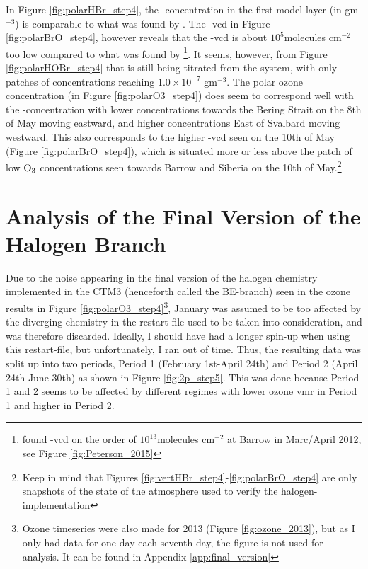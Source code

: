 \medskip

In Figure \ref{fig:polarHBr_step4}, the -concentration in the first model layer (in gm$^{-3}$) is comparable to what was found by \cite{barrie}. The -\acrshort{vcd} in Figure \ref{fig:polarBrO_step4}, however reveals that the -\acrshort{vcd} is about $10^5$molecules cm$^{-2}$ too low compared to what was found by \cite{Peterson2015}\footnote{\cite{Peterson2015} found -\acrshort{vcd} on the order of $10^13$molecules cm$^{-2}$ at Barrow in Marc/April 2012, see Figure \ref{fig:Peterson_2015}}. It seems, however, from Figure \ref{fig:polarHOBr_step4} that  is still being titrated from the system, with only patches of concentrations reaching $1.0\times10^{-7}$ gm$^{-3}$. The polar ozone concentration (in Figure \ref{fig:polarO3_step4}) does seem to correspond well with the -concentration with lower concentrations towards the Bering Strait on the 8th of May moving eastward, and higher concentrations East of Svalbard moving westward. This also corresponds to the higher -vcd seen on the 10th of May (Figure \ref{fig:polarBrO_step4}), which is situated more or less above the patch of low $\mathrm{O_3}$ concentrations seen towards Barrow and Siberia on the 10th of May.\footnote{Keep in mind that Figures \ref{fig:vertHBr_step4}-\ref{fig:polarBrO_step4} are only snapshots of the state of the atmosphere used to verify the halogen-implementation} 

\section{Analysis of the Final Version of the Halogen Branch}\label{sec:disc_final_Version}

Due to the noise appearing in the final version of the halogen chemistry implemented in the CTM3 (henceforth called the BE-branch) seen in the ozone results in Figure \ref{fig:polarO3_step4}\footnote{Ozone timeseries were also made for 2013 (Figure \ref{fig:ozone_2013}), but as I only had data for one day each seventh day, the figure is not used for analysis. It can be found in Appendix \ref{app:final_version}}, January was assumed to be too affected by the diverging chemistry in the restart-file used to be taken into consideration, and was therefore discarded. Ideally, I should have had a longer spin-up when using this restart-file, but unfortunately, I ran out of time. Thus, the resulting data was split up into two periods, Period 1 (February 1st-April 24th) and Period 2 (April 24th-June 30th) as shown in Figure \ref{fig:2p_step5}. This was done because Period 1 and 2 seems to be affected by different regimes with lower ozone \acrshort{vmr} in Period 1 and higher in Period 2.

